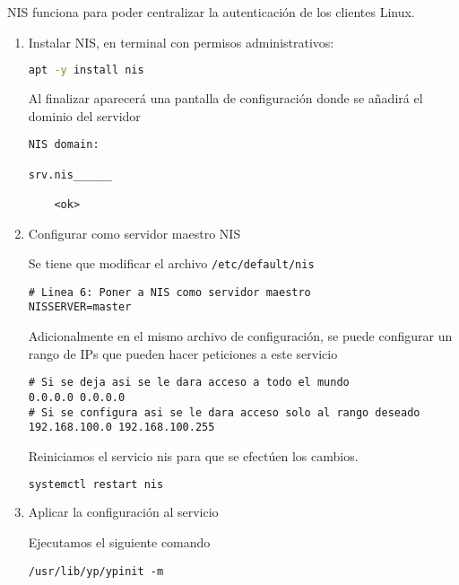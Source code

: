 \documentclass[../main.tex]{subfiles}
\begin{document}
NIS funciona para poder centralizar la autenticación de los clientes Linux.

\begin{enumerate}
\item Instalar NIS, en terminal con permisos administrativos:

  \begin{lstlisting}[language=bash]
apt -y install nis
  \end{lstlisting}

  Al finalizar aparecerá una pantalla de configuración donde se
  añadirá el dominio del servidor

  \begin{lstlisting}
NIS domain:

srv.nis______

    <ok>
\end{lstlisting}
  
\item Configurar como servidor maestro NIS

  Se tiene que modificar el archivo \lstinline|/etc/default/nis|

  \begin{lstlisting}[label={list:nis},caption=Modificación del archivo /etc/default/nis]
# Linea 6: Poner a NIS como servidor maestro
NISSERVER=master
\end{lstlisting}

  Adicionalmente en el mismo archivo de configuración, se puede
  configurar un rango de IPs que pueden hacer peticiones
  a este servicio

  \begin{lstlisting}
# Si se deja asi se le dara acceso a todo el mundo
0.0.0.0 0.0.0.0
# Si se configura asi se le dara acceso solo al rango deseado
192.168.100.0 192.168.100.255
\end{lstlisting}

  Reiniciamos el servicio nis para que se efectúen los cambios.

  \begin{lstlisting}[language=bash]
systemctl restart nis
\end{lstlisting}

  
\item Aplicar la configuración al servicio

  Ejecutamos el siguiente comando

  \begin{lstlisting}
/usr/lib/yp/ypinit -m
\end{lstlisting}


\end{enumerate}
\end{document}
